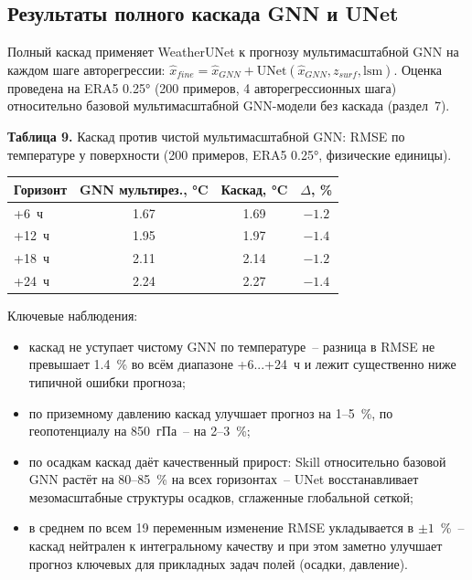 \documentclass[14pt,a4paper]{extarticle}
\newcounter{none}
\numberwithin{table}{section}
\numberwithin{figure}{section}
\numberwithin{equation}{section}
\providecommand{\tightlist}{%
  \setlength{\itemsep}{0pt}\setlength{\parskip}{0pt}}
\begin{document}
\subsection{Результаты полного каскада GNN и UNet}\label{ux440ux435ux437ux443ux43bux44cux442ux430ux442ux44b-ux43fux43eux43bux43dux43eux433ux43e-ux43aux430ux441ux43aux430ux434ux430-gnnunet}

Полный каскад применяет WeatherUNet к прогнозу мультимасштабной
GNN на каждом шаге авторегрессии:
$\hat{x}_{fine} = \hat{x}_{GNN} + \text{UNet}(\hat{x}_{GNN}, z_{surf}, \text{lsm})$.
Оценка проведена на ERA5 0.25° (200 примеров, 4 авторегрессионных шага) относительно
базовой мультимасштабной GNN-модели без каскада (раздел~7).

\textbf{Таблица 9.} Каскад против чистой мультимасштабной GNN:
RMSE по температуре у поверхности (200 примеров, ERA5 0.25°,
физические единицы).

{\def\LTcaptype{none} %
\begin{longtable}[]{@{}lccc@{}}
\toprule\noalign{}
Горизонт & GNN мультирез., °C & Каскад, °C & $\Delta$, \% \\
\midrule\noalign{}
\endhead
\bottomrule\noalign{}
\endlastfoot
+6~ч  & 1.67 & 1.69 & $-1.2$ \\
+12~ч & 1.95 & 1.97 & $-1.4$ \\
+18~ч & 2.11 & 2.14 & $-1.2$ \\
+24~ч & 2.24 & 2.27 & $-1.4$ \\
\end{longtable}
}

Ключевые наблюдения:

\begin{itemize}
\tightlist
\item
  каскад не уступает чистому GNN по температуре~-- разница в
  RMSE не превышает 1.4~\% во всём диапазоне +6...+24~ч и
  лежит существенно ниже типичной ошибки прогноза;
\item
  по приземному давлению каскад улучшает прогноз на 1--5~\%, по
  геопотенциалу на 850~гПа~-- на 2--3~\%;
\item
  по осадкам каскад даёт качественный прирост: Skill относительно
  базовой GNN растёт на 80--85~\% на всех горизонтах~-- UNet
  восстанавливает мезомасштабные структуры осадков, сглаженные
  глобальной сеткой;
\item
  в среднем по всем 19 переменным изменение RMSE укладывается в
  $\pm 1$~\%~-- каскад нейтрален к интегральному качеству и при
  этом заметно улучшает прогноз ключевых для прикладных задач полей
  (осадки, давление).
\end{itemize}
\end{document}
